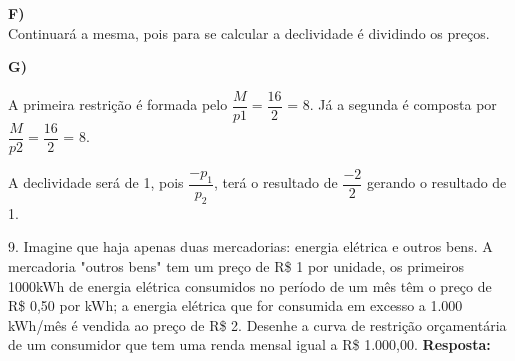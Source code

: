 \begin{flushleft}
\begin{center}
\begin{tikzpicture}
                 

\end{tikzpicture}    
\end{center}
\singlespacing

\textbf{F)}
\\
Continuará a mesma, pois para se calcular a declividade é dividindo os preços.
\singlespacing

\textbf{G)}

\begin{center}

A primeira restrição é formada pelo $\dfrac{M}{p\textit{1}} = \dfrac{16}{2}$ = 8. 
\singlespacing
Já a segunda é composta por $\dfrac{M}{p\textit{2}} = \dfrac{16}{2}$ = 8.

\end{center}

A declividade será de 1, pois $\dfrac{-p_{1}}{p_{2}}$, terá o resultado de $\dfrac{-2}{2}$ gerando o resultado de 1.
\singlespacing


9. Imagine que haja apenas duas mercadorias: energia elétrica e outros bens. A mercadoria "outros bens" tem um preço de R\$ 1 por unidade, os primeiros 1000kWh de energia elétrica consumidos no período de um mês têm o preço de R\$ 0,50 por kWh; a energia elétrica que for consumida em excesso a 1.000 kWh/mês é vendida ao preço de R\$ 2. Desenhe a curva de restrição orçamentária de um consumidor que tem uma renda mensal igual a R\$ 1.000,00.
\textbf{Resposta:}
\begin{center}
				\begin{tikzpicture}[scale=1] 
						

\end{tikzpicture}
\end{center}
\end{flushleft}
